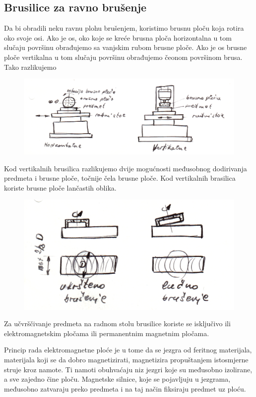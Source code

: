 \documentclass[a4paper,12pt]{article}
\numberwithin{figure}{section}
\begin{document}
\subsection{Brusilice za ravno brušenje}
Da bi obradili neku ravnu plohu brušenjem, koristimo brusnu ploču koja rotira oko svoje osi. Ako je os, oko koje se kreće brusna ploča horizontalna u tom slučaju površinu obrađujemo sa vanjskim rubom brusne ploče. Ako je os brusne ploče vertikalna u tom slučaju površinu obrađujemo čeonom površinom brusa. Tako razlikujemo
\begin{figure}[!h]
\centering
\includegraphics[scale=0.15]{image_28-1.png}
\end{figure}
\FloatBarrier
Kod vertikalnih brusilica razlikujemo dvije mogućnosti međusobnog dodirivanja predmeta i brusne ploče, točnije čela brusne ploče. Kod vertikalnih brasilica koriste brusne ploče lančastih oblika.
\begin{figure}[!h]
\centering
\includegraphics[scale=0.15]{image_28-2.png}
\end{figure}
\FloatBarrier
Za učvrščivanje predmeta na radnom stolu brusilice koriste se isključivo ili elektromagnetskim pločama ili permanentnim magnetnim pločama.\par
Princip rada elektromagnetne ploće je u tome da se jezgra od feritnog materijala, materijala koji se da dobro magnetizirati, magnetizira propuštanjem istosmjerne struje kroz namote. Ti namoti obuhvaćaju niz jezgri koje su međusobno izolirane, a sve zajedno čine ploču. Magnetske silnice, koje se pojavljuju u jezgrama, međusobno zatvaraju preko predmeta i na taj način fiksiraju predmet uz ploću.\par
\end{document}
